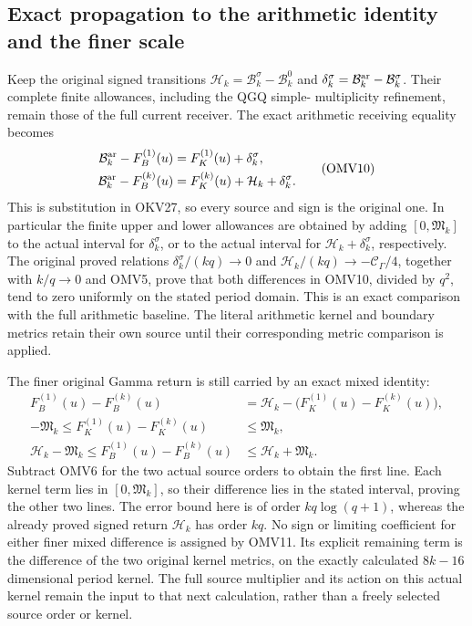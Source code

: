 \documentclass[11pt,a4paper]{article}
\begin{document}
\subsection{Exact propagation to the arithmetic identity and the finer scale}
Keep the original signed transitions
$\mathcal H_k=\mathcal B_k^\sigma-\mathcal B_k^0$ and
$\delta_k^\sigma=\mathcal B_k^{\rm ar}-\mathcal B_k^\sigma$.
Their complete finite allowances, including the QGQ simple-
multiplicity refinement, remain those of the full current receiver.
The exact arithmetic receiving equality becomes
\[
 \begin{split}
 \mathcal B_k^{\rm ar}-F_B^{(1)}(u)
       &=F_K^{(1)}(u)+\delta_k^\sigma,\\
 \mathcal B_k^{\rm ar}-F_B^{(k)}(u)
       &=F_K^{(k)}(u)+\mathcal H_k+\delta_k^\sigma.
 \end{split}\tag{OMV10}
\]
This is substitution in OKV27, so every source and sign is the
original one. In particular the finite upper and lower allowances
are obtained by adding $[0,\mathfrak M_k]$ to the actual interval
for $\delta_k^\sigma$, or to the actual interval for
$\mathcal H_k+\delta_k^\sigma$, respectively. The original proved
relations $\delta_k^\sigma/(kq)\to0$ and
$\mathcal H_k/(kq)\to-\mathcal C_\Gamma/4$, together with
$k/q\to0$ and OMV5, prove that both differences in OMV10,
divided by $q^2$, tend to zero uniformly on the stated period domain.
This is an exact comparison with the full arithmetic baseline.
The literal arithmetic kernel and boundary metrics retain their
own source until their corresponding metric comparison is applied.

The finer original Gamma return is still carried by an exact mixed
identity:
\[
 \begin{split}
 F_B^{(1)}(u)-F_B^{(k)}(u)
       &=\mathcal H_k-
                   \bigl(F_K^{(1)}(u)-F_K^{(k)}(u)\bigr),\\
 -\mathfrak M_k\leq F_K^{(1)}(u)-F_K^{(k)}(u)
       &\leq\mathfrak M_k,\\
 \mathcal H_k-\mathfrak M_k
       \leq F_B^{(1)}(u)-F_B^{(k)}(u)
       &\leq\mathcal H_k+\mathfrak M_k.
 \end{split}\tag{OMV11}
\]
Subtract OMV6 for the two actual source orders to obtain the first
line. Each kernel term lies in $[0,\mathfrak M_k]$, so their
difference lies in the stated interval, proving the other two lines.
The error bound here is of order $kq\log(q+1)$, whereas the
already proved signed return $\mathcal H_k$ has order $kq$.
No sign or limiting coefficient for either finer mixed difference
is assigned by OMV11. Its explicit remaining term is the difference
of the two original kernel metrics, on the exactly calculated
$8k-16$ dimensional period kernel. The full source multiplier and
its action on this actual kernel remain the input to that next
calculation, rather than a freely selected source order or kernel.
\end{document}
